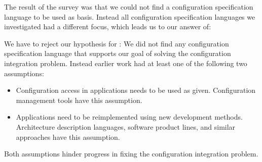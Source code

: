 The result of the survey was that we could not find a configuration specification language to be used as basis.
Instead all configuration specification languages we investigated had a different focus, which leads us to our answer of:
\rqBackgroundSpecificationLanguages*

\begin{finding}
We have to reject our hypothesis for :
We did not find any configuration specification language that supports our goal of solving the configuration integration problem.
Instead earlier work had at least one of the following two assumptions:
\begin{itemize}
\item Configuration access in applications needs to be used as given.
Configuration management tools have this assumption.
\item Applications need to be reimplemented using new development methods.
Architecture description languages, software product lines, and similar approaches have this assumption.
\end{itemize}
\end{finding}
\par
Both assumptions hinder progress in fixing the configuration integration problem.



\begingroup
\sloppy
\makeatletter
\g@addto@macro{\UrlBreaks}{\UrlOrds}
\makeatother

\endgroup




